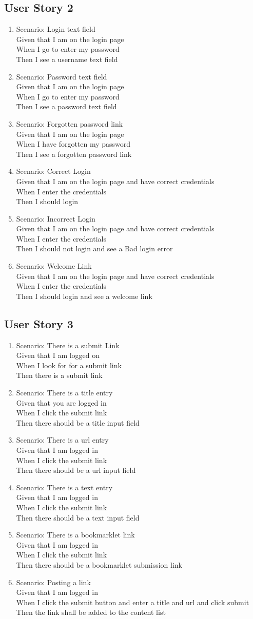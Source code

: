 \documentclass[titlepage]{article}
\newcommand{\feature}[4]{Scenario: {#1}\\
Given {#2}\\
When {#3}\\
Then {#4}\\
}
\begin{document}
\subsection{User Story 2}
\begin{enumerate}
\item 
\feature
{Login text field}
{that I am on the login page}
{I go to enter my password}
{I see a username text field}
\item
\feature
{Password text field}
{that I am on the login page}
{I go to enter my password}
{I see a password text field}
\item
\feature
{Forgotten password link}
{that I am on the login page}
{I have forgotten my password}
{I see a forgotten password link}
\item
\feature
{Correct Login}
{that I am on the login page and have correct credentials}
{I enter the credentials}
{I should login}
\item
\feature
{Incorrect Login}
{that I am on the login page and have correct credentials}
{I enter the credentials}
{I should not login and see a Bad login error}
\item
\feature
{Welcome Link}
{that I am on the login page and have correct credentials}
{I enter the credentials}
{I should login and see a welcome link}
\end{enumerate}
\subsection{User Story 3}
\begin{enumerate}
\item 
\feature
{There is a submit Link}
{that I am logged on}
{I look for for a submit link}
{there is a submit link}
\item
\feature
{There is a title entry}
{that you are logged in}
{I click the submit link}
{there should be a title input field}
\item
\feature
{There is a url entry}
{that I am logged in}
{I click the submit link}
{there should be a url input field}
\item
\feature
{There is a text entry}
{that I am logged in}
{I click the submit link}
{there should be a text input field}
\item
\feature
{There is a bookmarklet link}
{that I am logged in}
{I click the submit link}
{there should be a bookmarklet submission link}
\item
\feature
{Posting a link}
{that I am logged in}
{I click the submit button and enter a title and url and click submit}
{the link shall be added to the content list}
\end{enumerate}
\end{document}

